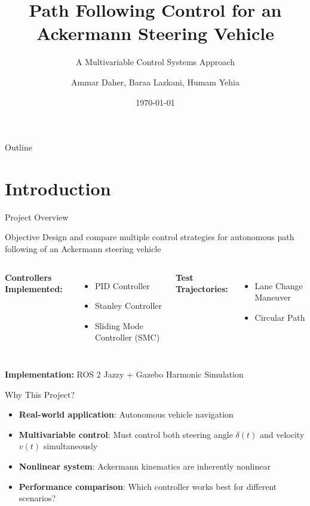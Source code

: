 \documentclass[10pt]{beamer}
\title[Path Following Control]{Path Following Control for an Ackermann Steering Vehicle}
\subtitle{A Multivariable Control Systems Approach}
\author{Ammar Daher, Baraa Lazkani, Humam Yehia}
\institute{Manara University}
\date{\today}
\begin{document}
\begin{frame}
  \titlepage
\end{frame}

\begin{frame}{Outline}
  \tableofcontents
\end{frame}

\section{Introduction}

\begin{frame}{Project Overview}
  \begin{block}{Objective}
    Design and compare multiple control strategies for autonomous path following of an Ackermann steering vehicle
  \end{block}

  \vspace{0.5cm}

  \begin{columns}[c]
    \textbf{Controllers Implemented:}
    \begin{itemize}
      \item PID Controller
      \item Stanley Controller
      \item Sliding Mode Controller (SMC)
    \end{itemize}

    \textbf{Test Trajectories:}
    \begin{itemize}
      \item Lane Change Maneuver
      \item Circular Path
    \end{itemize}
  \end{columns}

  \vspace{0.5cm}

  \textbf{Implementation:} ROS 2 Jazzy + Gazebo Harmonic Simulation
\end{frame}

\begin{frame}{Why This Project?}
  \begin{itemize}
    \item \textbf{Real-world application}: Autonomous vehicle navigation
    \item \textbf{Multivariable control}: Must control both steering angle $\delta(t)$ and velocity $v(t)$ simultaneously
    \item \textbf{Nonlinear system}: Ackermann kinematics are inherently nonlinear
    \item \textbf{Performance comparison}: Which controller works best for different scenarios?
  \end{itemize}
\end{frame}
\end{document}

